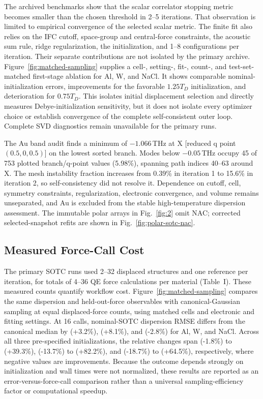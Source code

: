 \documentclass[aps,prb,reprint,amsmath,amssymb,floatfix]{revtex4-2}
\begin{document}
\color{revisionblue}
The archived benchmarks show that the scalar correlator stopping metric becomes
smaller than the chosen threshold in 2--5 iterations. That observation is
limited to empirical convergence of the selected scalar metric. The
finite fit also relies on the IFC cutoff, space-group and central-force
constraints, the acoustic sum rule, ridge regularization, the initialization,
and 1--8 configurations per iteration. Their separate contributions are not
isolated by the primary archive. Figure~\ref{fig:matched-sampling} supplies a
cell-, setting-, fit-, count-, and test-set-matched first-stage ablation for Al,
W, and NaCl. It shows comparable nominal-initialization errors, improvements
for the favorable \(1.25T_D\) initialization, and deterioration for
\(0.75T_D\). This isolates initial displacement selection and directly measures
Debye-initialization sensitivity, but it does not isolate every optimizer
choice or establish convergence of the complete self-consistent outer loop.
Complete SVD diagnostics remain unavailable for the primary runs.
\color{black}

\color{revisionblue}
The Au band audit finds a minimum of \(-1.066\)\,THz at X
[reduced q point \((0.5,0,0.5)\)] on the lowest sorted branch. Modes below
\(-0.05\)\,THz occupy 45 of 753 plotted branch/q-point values (5.98\%),
spanning path indices 40--63 around X. The mesh instability fraction increases
from 0.39\% in iteration 1 to 15.6\% in iteration 2, so self-consistency did
not resolve it. Dependence on cutoff, cell, symmetry constraints,
regularization, electronic convergence, and volume remains unseparated, and Au
is excluded from the stable high-temperature dispersion assessment. The
immutable polar arrays in Fig.~\ref{fig:2} omit NAC; corrected
selected-snapshot refits are shown in Fig.~\ref{fig:polar-sotc-nac}.
\color{black}

\color{revisionblue}
\subsection{Measured Force-Call Cost}\label{computational-efficiency}
\color{black}

\color{revisionblue}
The primary SOTC runs used 2--32 displaced structures and one reference per
iteration, for totals of 4--36 QE force calculations per material (Table~I).
These measured counts quantify workflow cost. Figure~\ref{fig:matched-sampling}
compares the same dispersion and held-out-force observables with
canonical-Gaussian sampling at equal displaced-force counts, using matched
cells and electronic and fitting settings. At 16 calls, nominal-SOTC dispersion
RMSE differs from the canonical median by (+3.2\%), (+8.1\%), and
(-2.8\%) for Al, W, and NaCl. Across all three pre-specified initializations,
the relative changes span (-1.8\%) to (+39.3\%), (-13.7\%) to
(+82.2\%), and (-18.7\%) to (+64.5\%), respectively, where negative
values are improvements. Because the outcome depends strongly on initialization
and wall times were not normalized, these results are reported as an
error-versus-force-call comparison rather than a universal sampling-efficiency
factor or computational speedup.
\color{black}
\end{document}
